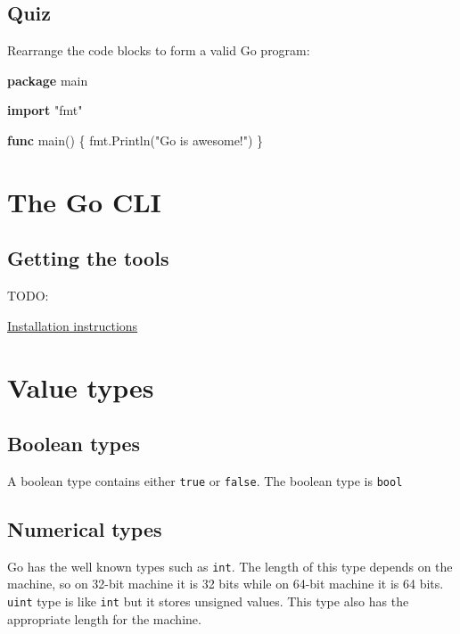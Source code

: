 \documentclass[]{book}
\newenvironment{Shaded}{\begin{snugshade}}{\end{snugshade}}
\newcommand{\KeywordTok}[1]{\textcolor[rgb]{0.13,0.29,0.53}{\textbf{#1}}}
\newcommand{\NormalTok}[1]{#1}
\newcommand{\StringTok}[1]{\textcolor[rgb]{0.31,0.60,0.02}{#1}}
\begin{document}
\hypertarget{quiz-3}{%
\subsection{Quiz}\label{quiz-3}}

Rearrange the code blocks to form a valid Go program:

\begin{Shaded}
\begin{Highlighting}[]
\KeywordTok{package}\NormalTok{ main}

\KeywordTok{import} \StringTok{"fmt"}

\KeywordTok{func}\NormalTok{ main() \{}
\NormalTok{    fmt.Println(}\StringTok{"Go is awesome!"}\NormalTok{)}
\NormalTok{\}}
\end{Highlighting}
\end{Shaded}

\hypertarget{the-go-cli}{%
\section{The Go CLI}\label{the-go-cli}}

\hypertarget{getting-the-tools}{%
\subsection{Getting the tools}\label{getting-the-tools}}

TODO:

\href{https://golang.org/doc/install}{Installation instructions}

\hypertarget{value-types}{%
\section{Value types}\label{value-types}}

\hypertarget{boolean-types}{%
\subsection{Boolean types}\label{boolean-types}}

A boolean type contains either \texttt{true} or \texttt{false}. The boolean type is \texttt{bool}

\hypertarget{numerical-types}{%
\subsection{Numerical types}\label{numerical-types}}

Go has the well known types such as \texttt{int}. The length of this type depends on
the machine, so on 32-bit machine it is 32 bits while on 64-bit machine it is
64 bits. \texttt{uint} type is like \texttt{int} but it stores unsigned values. This type
also has the appropriate length for the machine.
\end{document}
